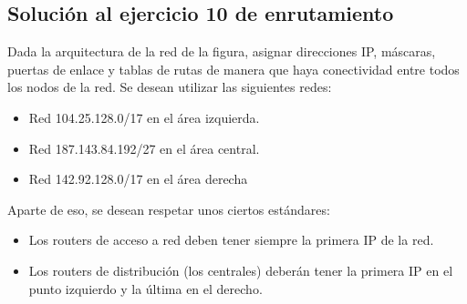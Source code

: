 \documentclass[letterpaper,10pt,spanish]{sphinxmanual}
\begin{document}
\subsection{Solución al ejercicio 10 de enrutamiento}
\label{\detokenize{t2_integracion_elementos/ejercicios_subredes_ipv4/ejercicios_dos_router:solucion-al-ejercicio-10-de-enrutamiento}}
\sphinxAtStartPar
Dada la arquitectura de la red de la figura, asignar direcciones IP, máscaras, puertas de enlace y tablas de rutas de manera que haya conectividad entre todos
los nodos de la red. Se desean utilizar las siguientes redes:
\begin{itemize}
\item {} 
\sphinxAtStartPar
Red 104.25.128.0/17 en el área izquierda.

\item {} 
\sphinxAtStartPar
Red 187.143.84.192/27 en el área central.

\item {} 
\sphinxAtStartPar
Red 142.92.128.0/17 en el área derecha

\end{itemize}

\begin{figure}[htbp]
\centering

\noindent{}
\end{figure}

\sphinxAtStartPar
Aparte de eso, se desean respetar unos ciertos estándares:
\begin{itemize}
\item {} 
\sphinxAtStartPar
Los routers de acceso a red deben tener siempre la primera IP de la red.

\item {} 
\sphinxAtStartPar
Los routers de distribución (los centrales) deberán tener la primera IP en el punto izquierdo y la última en el derecho.

\end{itemize}
\end{document}
